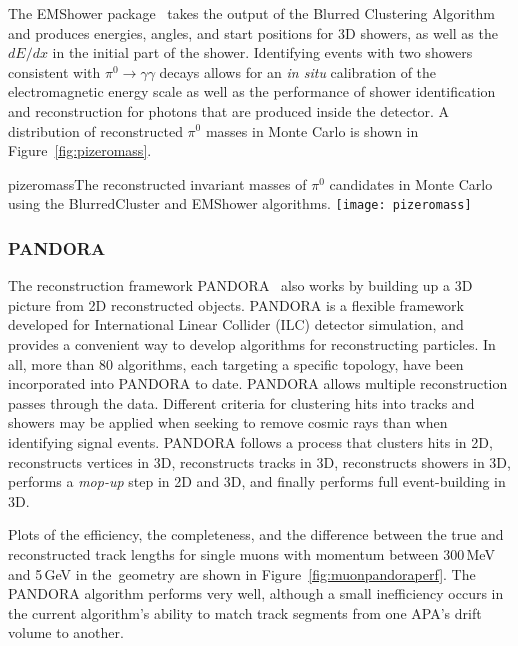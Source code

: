 The EMShower package~\cite{emshowerpackage} takes the output of the
Blurred Clustering Algorithm and
produces energies, angles, and start positions for 3D showers, as
well as the $dE/dx$ in the initial part of the shower.  Identifying
events with two showers consistent with $\pi^0\rightarrow\gamma\gamma$
decays allows for an \textit{in situ} calibration of the electromagnetic
energy scale as well as the performance of shower identification and
reconstruction for photons that are produced inside the detector.  A
distribution of reconstructed $\pi^0$ masses in Monte Carlo is shown
in Figure~\ref{fig:pizeromass}.

\begin{cdrfigure}{pizeromass}{The reconstructed invariant masses of $\pi^0$ candidates in
  Monte Carlo using the BlurredCluster and EMShower algorithms.}
\texttt{[image: pizeromass]}
\end{cdrfigure}

\subsubsection{PANDORA}

The reconstruction framework PANDORA~\cite{Marshall:2015rfa} also works by
building up a 3D picture from 2D
reconstructed objects.  PANDORA is a flexible framework developed for
International Linear Collider (ILC) detector simulation, and provides a convenient way to develop
algorithms for reconstructing particles.  In all, more than 80
algorithms, each targeting a specific topology, have been incorporated
into PANDORA to date.  PANDORA allows multiple reconstruction passes through the data.  
Different criteria for clustering hits into tracks and
showers may be applied when seeking to remove cosmic rays %
than when
identifying signal events.  PANDORA follows a process that clusters hits in 2D,
reconstructs vertices in 3D, reconstructs tracks in 3D,
reconstructs showers in 3D, performs a \textit{mop-up} step in 2D and 3D, and finally performs
full event-building in 3D.


Plots of the efficiency, the completeness, and the  difference between the true and reconstructed
track lengths for single muons with momentum between 300\,MeV and 5\,GeV in the~\pdsp geometry are
shown in Figure~\ref{fig:muonpandoraperf}.  The PANDORA algorithm performs very well, although a small
inefficiency occurs in the current algorithm's ability to match track segments from one APA's drift volume to another.

